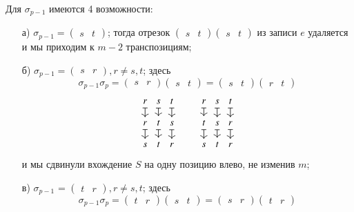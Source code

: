 \documentclass{article}
\begin{document}
Для $\sigma_{p-1}$ имеются 4 возможности:
\begin{enumerate}
    \item[а)] $\sigma_{p-1} = (\begin{matrix}s&t\end{matrix})$; тогда отрезок $(\begin{matrix}s&t\end{matrix})(\begin{matrix}s&t\end{matrix})$ из записи $e$ удаляется и мы приходим к $m - 2$ транспозициям;
    \item[б)] $\sigma_{p-1} = (\begin{matrix}s&r\end{matrix}), r \neq s, t$; здесь \[
    \sigma_{p-1}\sigma_p = (\begin{matrix}s&r\end{matrix})(\begin{matrix}s&t\end{matrix}) = (\begin{matrix}s&t\end{matrix})(\begin{matrix}r&t\end{matrix}) \]\[
    \begin{tikzcd}[column sep=0.5, row sep=small]
        r \dar[mapsto]	& s \dar[mapsto]	& t \dar[mapsto]	\\
        r \dar[mapsto]	& t \dar[mapsto]	& s \dar[mapsto]	\\
        s				& t					& r
    \end{tikzcd}
    \qquad 
    \begin{tikzcd}[column sep=0.5, row sep=small]
		r \dar[mapsto]	& s \dar[mapsto]	& t \dar[mapsto]	\\
		t \dar[mapsto]	& s \dar[mapsto]	& r \dar[mapsto]	\\
		s				& t					& r
    \end{tikzcd}\] и мы сдвинули вхождение $S$ на одну позицию влево, не изменив $m$;
    \item[в)] $\sigma_{p-1}$ = $(\begin{matrix}t&r\end{matrix}), r \neq s, t$; здесь \[
        \sigma_{p-1}\sigma_p = (\begin{matrix}t&r\end{matrix})(\begin{matrix}s&t\end{matrix}) = (\begin{matrix}s&r\end{matrix})(\begin{matrix}t&r\end{matrix})
\]
\end{enumerate}
\end{document}
